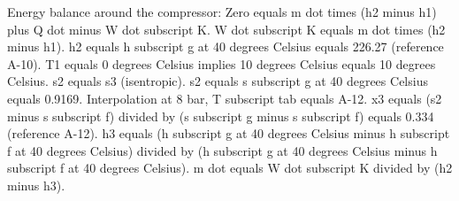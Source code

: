 Energy balance around the compressor:
Zero equals m dot times (h2 minus h1) plus Q dot minus W dot subscript K.
W dot subscript K equals m dot times (h2 minus h1).
h2 equals h subscript g at 40 degrees Celsius equals 226.27 (reference A-10).
T1 equals 0 degrees Celsius implies 10 degrees Celsius equals 10 degrees Celsius.
s2 equals s3 (isentropic).
s2 equals s subscript g at 40 degrees Celsius equals 0.9169.
Interpolation at 8 bar, T subscript tab equals A-12.
x3 equals (s2 minus s subscript f) divided by (s subscript g minus s subscript f) equals 0.334 (reference A-12).
h3 equals (h subscript g at 40 degrees Celsius minus h subscript f at 40 degrees Celsius) divided by (h subscript g at 40 degrees Celsius minus h subscript f at 40 degrees Celsius).
m dot equals W dot subscript K divided by (h2 minus h3).